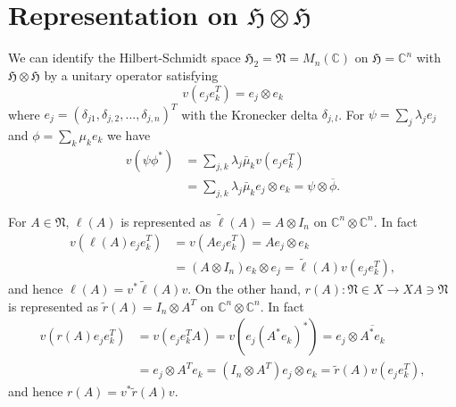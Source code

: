 \section{Representation on $\mathfrak{H}\otimes\mathfrak{H}$}

 We can identify the Hilbert-Schmidt space $\mathfrak{H}_2=\mathfrak{N}=M_n(\mathbb{C})$ on $\mathfrak{H}=\mathbb{C}^n$ with $\mathfrak{H}\otimes\mathfrak{H}$
by a unitary operator satisfying 
$$
v(e_je_k^T)=e_j\otimes e_k
$$
where $e_j=(\delta_{j1},\delta_{j,2},...,\delta_{j,n})^T$ with the Kronecker delta $\delta_{j,l}$. 
For $\psi=\sum_j \lambda_j e_j$ and $\phi=\sum_k \mu_k e_k$
we have
\begin{equation}
\begin{split}
v(\psi\phi^\ast)&=\sum_{j,k}\lambda_j\bar{\mu}_k v(e_je_k^T)\\
&=\sum_{j,k}\lambda_j\bar{\mu}_k e_j\otimes e_k={\psi}\otimes \overline{\phi}.
\end{split}
\end{equation}

For $A\in \mathfrak{N}$, $\ell(A)$ is represented as $\tilde{\ell}(A)=A\otimes I_n$ on $\mathbb{C}^n\otimes \mathbb{C}^n$.
In fact
 \begin{equation}
 \begin{split}
 v(\ell(A)e_je_k^T)&=v(Ae_je_k^T)=Ae_j\otimes e_k\\
 &= (A\otimes I_n)e_k\otimes  e_j=\tilde{\ell}(A)v(e_je_k^T),
 \end{split} 
 \end{equation}
 and hence $\ell(A)=v^{\ast}\tilde{\ell}(A)v$. 
On the other hand, $r(A):\mathfrak{N}\in X \to XA\ni\mathfrak{N}$ is 
represented as $\tilde{r}(A)=I_n\otimes A^T$ on $\mathbb{C}^n\otimes \mathbb{C}^n$.
In fact
 \begin{equation}
 \begin{split}
 v(r(A)e_je_k^T)&=v(e_je_k^TA)=v(e_j(A^\ast e_k)^\ast)=e_j\otimes \overline{A^\ast e_k}\\
 &= e_j \otimes A^T e_k= (I_n\otimes A^T)e_j\otimes  e_k=\tilde{r}(A)v(e_je_k^T),
 \end{split} 
 \end{equation}
 and hence $r(A)=v^{\ast}\tilde{r}(A) v$. 

